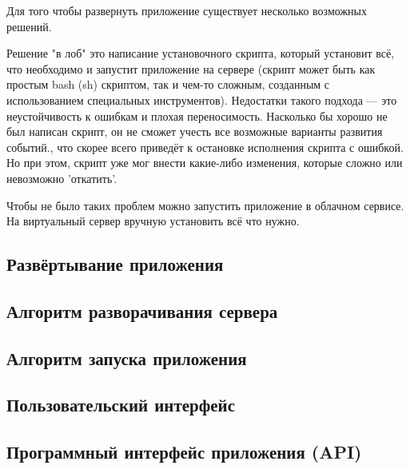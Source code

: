 \documentclass[14pt,a4paper]{scrartcl}
\begin{document}
    Для того чтобы развернуть приложение существует несколько возможных решений.

    Решение "в лоб" это написание установочного скрипта, который установит всё, что необходимо и запустит приложение на сервере (скрипт может быть как простым bash (sh) скриптом, так и чем-то сложным, созданным с использованием специальных инструментов).
    Недостатки такого подхода — это неустойчивость к ошибкам и плохая переносимость.
    Насколько бы хорошо не был написан скрипт, он не сможет учесть все возможные варианты развития событий., что скорее всего приведёт к остановке исполнения скрипта с ошибкой.
    Но при этом, скрипт уже мог внести какие-либо изменения, которые сложно или невозможно 'откатить'.

    Чтобы не было таких проблем можно запустить приложение в облачном сервисе.
    На виртуальный сервер вручную установить всё что нужно.



    \subsection[Развёртывание приложения]{Развёртывание приложения}
    \subsection[Алгоритм разворачивания сервера]{Алгоритм разворачивания сервера}
    \subsection[Алгоритм запуска приложения]{Алгоритм запуска приложения}
    \subsection[Пользовательский интерфейс]{Пользовательский интерфейс}
    \subsection[Программный интерфейс приложения]{Программный интерфейс приложения (API)}

    \newpage
\end{document}
